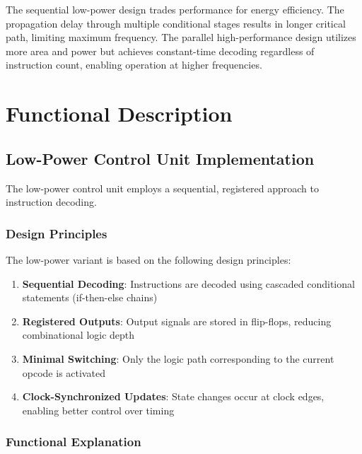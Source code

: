 \documentclass[15pt,a4paper]{report}
\begin{document}
The sequential low-power design trades performance for energy efficiency. The propagation delay through multiple conditional stages results in longer critical path, limiting maximum frequency. The parallel high-performance design utilizes more area and power but achieves constant-time decoding regardless of instruction count, enabling operation at higher frequencies.

\newpage

\chapter{Functional Description}

\section{Low-Power Control Unit Implementation}

The low-power control unit employs a sequential, registered approach to instruction decoding.

\subsection{Design Principles}

The low-power variant is based on the following design principles:

\begin{enumerate}
    \item \textbf{Sequential Decoding}: Instructions are decoded using cascaded conditional statements (if-then-else chains)
    
    \item \textbf{Registered Outputs}: Output signals are stored in flip-flops, reducing combinational logic depth
    
    \item \textbf{Minimal Switching}: Only the logic path corresponding to the current opcode is activated
    
    \item \textbf{Clock-Synchronized Updates}: State changes occur at clock edges, enabling better control over timing
\end{enumerate}

\subsection{Functional Explanation}
\end{document}
